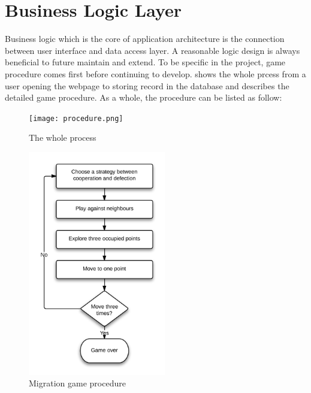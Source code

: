 \section{Business Logic Layer}

Business logic which is the core of application architecture is the connection between user interface and data access layer. A reasonable logic design is always beneficial to future maintain and extend. To be specific in the project, game procedure comes first before continuing to develop.  shows the whole prcess from a user opening the webpage to storing record in the database and  describes the detailed game procedure. As a whole, the procedure can be listed as follow:

\begin{figure}[!htb]
  \centering
  \texttt{[image: procedure.png]}
  \caption{The whole process}
  \label{Figure:fig32}
\end{figure}

\begin{figure}[!htb]
  \centering
  \includegraphics[width=6cm]{flow.png}
  \caption{Migration game procedure}
  \label{Figure:fig31}
\end{figure}

